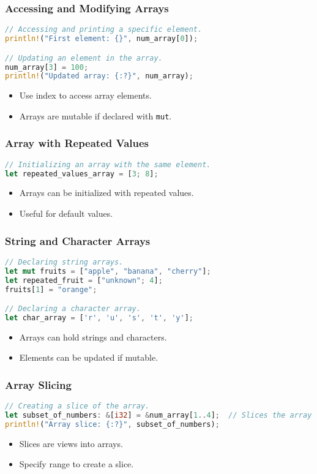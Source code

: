 \documentclass[aspectratio=169, table]{beamer}
\begin{document}
\begin{frame}[fragile]
\frametitle{Accessing and Modifying Arrays}
\begin{lstlisting}[language=Rust]
// Accessing and printing a specific element.
println!("First element: {}", num_array[0]);

// Updating an element in the array.
num_array[3] = 100; 
println!("Updated array: {:?}", num_array);
\end{lstlisting}
\begin{itemize}
\item Use index to access array elements.
\item Arrays are mutable if declared with \texttt{mut}.
\end{itemize}
\end{frame}

\begin{frame}[fragile]
\frametitle{Array with Repeated Values}
\begin{lstlisting}[language=Rust]
// Initializing an array with the same element.
let repeated_values_array = [3; 8];
\end{lstlisting}
\begin{itemize}
\item Arrays can be initialized with repeated values.
\item Useful for default values.
\end{itemize}
\end{frame}

\begin{frame}[fragile]
\frametitle{String and Character Arrays}
\begin{lstlisting}[language=Rust]
// Declaring string arrays.
let mut fruits = ["apple", "banana", "cherry"];
let repeated_fruit = ["unknown"; 4]; 
fruits[1] = "orange"; 

// Declaring a character array.
let char_array = ['r', 'u', 's', 't', 'y'];
\end{lstlisting}
\begin{itemize}
\item Arrays can hold strings and characters.
\item Elements can be updated if mutable.
\end{itemize}
\end{frame}

\begin{frame}[fragile]
\frametitle{Array Slicing}
\begin{lstlisting}[language=Rust]
// Creating a slice of the array.
let subset_of_numbers: &[i32] = &num_array[1..4];  // Slices the array from index 1 to 3.
println!("Array slice: {:?}", subset_of_numbers);
\end{lstlisting}
\begin{itemize}
	\item Slices are views into arrays.
	\item Specify range to create a slice.
\end{itemize}
\end{frame}
\end{document}
